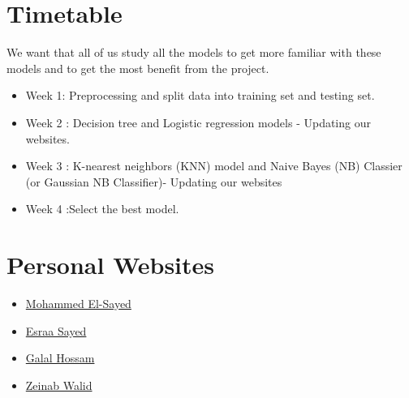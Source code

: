 \documentclass[10pt,twocolumn,letterpaper]{article}
\begin{document}
\section{Timetable}


 We want that all of us study all the models to get more familiar with these models and to get the most benefit from the project.
\begin{itemize}
	\item Week 1: Preprocessing and split data into training set and testing set.
	\item Week 2 : Decision tree and Logistic regression models - Updating our websites.
	\item Week 3 : K-nearest neighbors (KNN) model and Naive Bayes (NB) Classier (or Gaussian NB Classifier)- Updating our websites
	\item Week 4 :Select the best model.
\end{itemize}

\section{Personal Websites}\begin{itemize}
\item \href{http://mohammedelsayed412.github.io/}{Mohammed El-Sayed}
\item \href{https://esraasayed98.github.io/EsraaSayed.github.io/}{Esraa Sayed}
\item \href{https://galal-hossam-eldien.github.io/Galal-Hosam-Eldien/}{Galal Hossam}
\item \href{https://zeinabwalid.github.io/}{Zeinab Walid}
\end{itemize}


{\small


}
\end{document}
